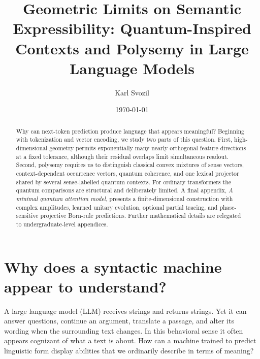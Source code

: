 \documentclass[
  aps,
  reprint,
  superscriptaddress,
  floatfix,
  nofootinbib,
  longbibliography
]{revtex4-2}
\begin{document}
\title{Geometric Limits on Semantic Expressibility: Quantum-Inspired Contexts and Polysemy in Large Language Models}

\author{Karl Svozil}

\date{\today}

\begin{abstract}
Why can next-token prediction produce language that appears meaningful?
Beginning with tokenization and vector encoding, we study two parts of this
question.  First, high-dimensional geometry permits exponentially many nearly
orthogonal feature directions at a fixed tolerance, although their residual
overlaps limit simultaneous readout.  Second, polysemy requires us to
distinguish classical convex mixtures of sense vectors, context-dependent
occurrence vectors, quantum coherence, and one lexical projector shared by
several sense-labelled quantum contexts.  For ordinary transformers the
quantum comparisons are structural and deliberately limited.  A final appendix, \emph{A minimal
quantum attention model}, presents a finite-dimensional construction with
complex amplitudes, learned unitary evolution, optional partial tracing, and
phase-sensitive projective Born-rule predictions.
Further mathematical details are
relegated to undergraduate-level appendices.
\end{abstract}

\maketitle

\section{Why does a syntactic machine appear to understand?}
\label{sec:puzzle}

A large language model (LLM) receives strings and returns strings.  Yet it can
answer questions, continue an argument, translate a passage, and alter its
wording when the surrounding text changes.  In this behavioral sense it often
appears cognizant of what a text is about.  How can a machine trained to
predict linguistic form display abilities that we ordinarily describe in
terms of meaning?
\end{document}
